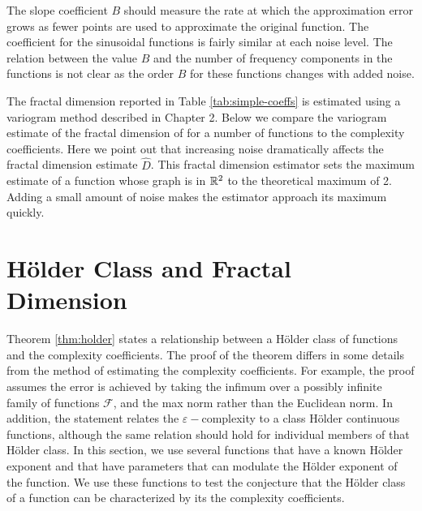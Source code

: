 The slope coefficient $B$ should measure the rate at which the approximation error grows as fewer points are used to approximate the original function. The coefficient for the sinusoidal functions is fairly similar at each noise level. The relation between 
the value $B$ and the number of frequency components in the functions is not clear as the order $B$ for these functions 
changes with added noise.





The fractal dimension reported in Table \ref{tab:simple-coeffs}
is estimated using a variogram method described in Chapter 2. Below we compare the variogram estimate of the fractal dimension of for a number of functions to the complexity coefficients. 
Here we point out that increasing noise dramatically 
affects the fractal 
dimension estimate $\hat D$. This fractal dimension estimator sets the maximum estimate of a function whose graph is in $\mathbb R^2$ to the theoretical maximum of 2. Adding a small amount of noise makes the estimator approach its maximum quickly.


\section{H\"older Class and Fractal Dimension}

Theorem \ref{thm:holder} states a relationship 
between a H\"older class of functions 
and the complexity coefficients. The proof of the theorem differs in some details from the method of estimating the complexity coefficients. 
For example, the proof assumes the error is 
achieved by taking the infimum over a possibly 
infinite family of functions $\mathcal{F}$,  
and the max norm rather than the Euclidean 
norm. In addition, the statement relates
the $\varepsilon-$complexity to a class 
H\"older continuous functions, although the 
same relation should hold for individual members
of that H\"older class.
In this section, we use several functions that 
have a known H\"older exponent and that 
have parameters that can modulate the 
H\"older exponent of the function. We use these functions to test the conjecture that the H\"older class of a function can be characterized
by its the complexity coefficients.  

